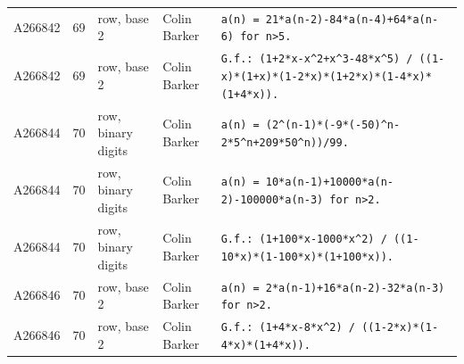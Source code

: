 \documentclass[11pt]{article}
\theoremstyle{definition}
\theoremstyle{remark}
\begin{document}
{\begin{longtable}{p{1.3cm}p{0.7cm}p{2.4cm}p{2.3cm}p{7.3cm}}
A266842 & 69 & row, base 2 & Colin Barker & \texttt{a(n)\allowbreak{} \allowbreak{}=\allowbreak{} \allowbreak{}21*\allowbreak{}a(n-\allowbreak{}2)\allowbreak{}-\allowbreak{}84*\allowbreak{}a(n-\allowbreak{}4)\allowbreak{}+\allowbreak{}64*\allowbreak{}a(n-\allowbreak{}6)\allowbreak{} \allowbreak{}for \allowbreak{}n>5.} \\
A266842 & 69 & row, base 2 & Colin Barker & \texttt{G.f.: \allowbreak{}(1+\allowbreak{}2*\allowbreak{}x-\allowbreak{}x\^{}2+\allowbreak{}x\^{}3-\allowbreak{}48*\allowbreak{}x\^{}5)\allowbreak{} \allowbreak{}/\allowbreak{} \allowbreak{}((1-\allowbreak{}x)\allowbreak{}*\allowbreak{}(1+\allowbreak{}x)\allowbreak{}*\allowbreak{}(1-\allowbreak{}2*\allowbreak{}x)\allowbreak{}*\allowbreak{}(1+\allowbreak{}2*\allowbreak{}x)\allowbreak{}*\allowbreak{}(1-\allowbreak{}4*\allowbreak{}x)\allowbreak{}*\allowbreak{}(1+\allowbreak{}4*\allowbreak{}x)\allowbreak{})\allowbreak{}.} \\
A266844 & 70 & row, binary digits & Colin Barker & \texttt{a(n)\allowbreak{} \allowbreak{}=\allowbreak{} \allowbreak{}(2\^{}(n-\allowbreak{}1)\allowbreak{}*\allowbreak{}(-\allowbreak{}9*\allowbreak{}(-\allowbreak{}50)\allowbreak{}\^{}n-\allowbreak{}2*\allowbreak{}5\^{}n+\allowbreak{}209*\allowbreak{}50\^{}n)\allowbreak{})\allowbreak{}/\allowbreak{}99.} \\
A266844 & 70 & row, binary digits & Colin Barker & \texttt{a(n)\allowbreak{} \allowbreak{}=\allowbreak{} \allowbreak{}10*\allowbreak{}a(n-\allowbreak{}1)\allowbreak{}+\allowbreak{}10000*\allowbreak{}a(n-\allowbreak{}2)\allowbreak{}-\allowbreak{}100000*\allowbreak{}a(n-\allowbreak{}3)\allowbreak{} \allowbreak{}for \allowbreak{}n>2.} \\
A266844 & 70 & row, binary digits & Colin Barker & \texttt{G.f.: \allowbreak{}(1+\allowbreak{}100*\allowbreak{}x-\allowbreak{}1000*\allowbreak{}x\^{}2)\allowbreak{} \allowbreak{}/\allowbreak{} \allowbreak{}((1-\allowbreak{}10*\allowbreak{}x)\allowbreak{}*\allowbreak{}(1-\allowbreak{}100*\allowbreak{}x)\allowbreak{}*\allowbreak{}(1+\allowbreak{}100*\allowbreak{}x)\allowbreak{})\allowbreak{}.} \\
A266846 & 70 & row, base 2 & Colin Barker & \texttt{a(n)\allowbreak{} \allowbreak{}=\allowbreak{} \allowbreak{}2*\allowbreak{}a(n-\allowbreak{}1)\allowbreak{}+\allowbreak{}16*\allowbreak{}a(n-\allowbreak{}2)\allowbreak{}-\allowbreak{}32*\allowbreak{}a(n-\allowbreak{}3)\allowbreak{} \allowbreak{}for \allowbreak{}n>2.} \\
A266846 & 70 & row, base 2 & Colin Barker & \texttt{G.f.: \allowbreak{}(1+\allowbreak{}4*\allowbreak{}x-\allowbreak{}8*\allowbreak{}x\^{}2)\allowbreak{} \allowbreak{}/\allowbreak{} \allowbreak{}((1-\allowbreak{}2*\allowbreak{}x)\allowbreak{}*\allowbreak{}(1-\allowbreak{}4*\allowbreak{}x)\allowbreak{}*\allowbreak{}(1+\allowbreak{}4*\allowbreak{}x)\allowbreak{})\allowbreak{}.} \\

\end{longtable}}
\end{document}
